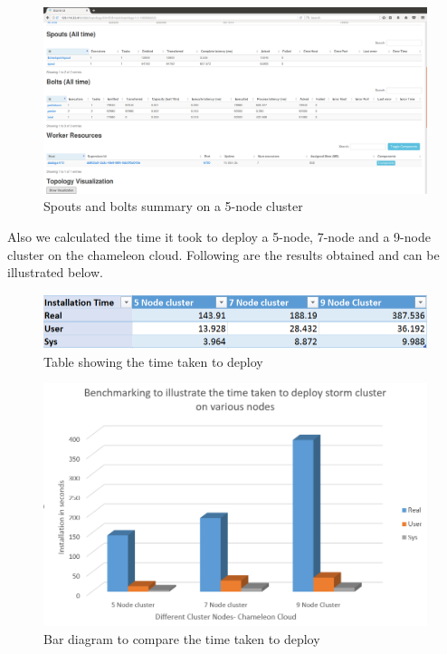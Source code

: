 \documentclass[9pt,twocolumn,twoside]{../../styles/osajnl}
\begin{document}
\begin{figure}[!htb]
  \includegraphics[width=\linewidth]{images/bench-5.png}
  \caption{Spouts and bolts summary on a 5-node cluster }
  \label{Spouts and bolts summary on a 5-node cluster}
\end{figure}



Also we calculated the time it took to deploy a 5-node, 7-node and a 9-node cluster on the chameleon cloud. Following are the results obtained and can be illustrated below.


\begin{figure}[!htb]
  \includegraphics[width=\linewidth]{images/table-1.png}
  \caption{Table showing the time taken to deploy }
  \label{Table showing the time taken to deploy}
\end{figure}


\begin{figure}[!htb]
  \includegraphics[width=\linewidth]{images/bar-1.png}
  \caption{Bar diagram to compare the time taken to deploy }
  \label{Bar diagram to compare the time taken to deploy}
\end{figure}
\end{document}
